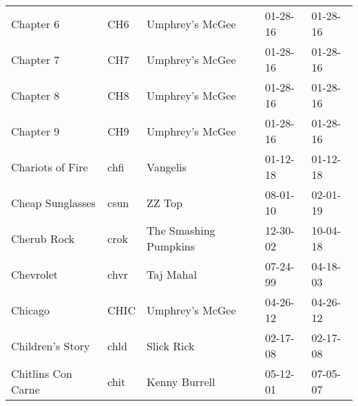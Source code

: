 \begin{longtable}{p{}p{}p{}p{}p{}}
                                                               Chapter 6 &           CH6 &                                          Umphrey's McGee &              01-28-16 &             01-28-16 \\
                                                               Chapter 7 &           CH7 &                                          Umphrey's McGee &              01-28-16 &             01-28-16 \\
                                                               Chapter 8 &           CH8 &                                          Umphrey's McGee &              01-28-16 &             01-28-16 \\
                                                               Chapter 9 &           CH9 &                                          Umphrey's McGee &              01-28-16 &             01-28-16 \\
                                                        Chariots of Fire &          chfi &                                                 Vangelis &              01-12-18 &             01-12-18 \\
                                                        Cheap Sunglasses &          csun &                                                   ZZ Top &              08-01-10 &             02-01-19 \\
                                                             Cherub Rock &          crok &                                    The Smashing Pumpkins &              12-30-02 &             10-04-18 \\
                                                               Chevrolet &          chvr &                                                Taj Mahal &              07-24-99 &             04-18-03 \\
                                                                 Chicago &          CHIC &                                          Umphrey's McGee &              04-26-12 &             04-26-12 \\
                                                        Children's Story &          chld &                                               Slick Rick &              02-17-08 &             02-17-08 \\
                                                      Chitlins Con Carne &          chit &                                            Kenny Burrell &              05-12-01 &             07-05-07 \\

\end{longtable}
